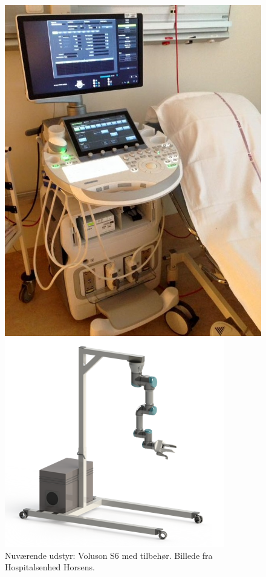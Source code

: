 \begin{figure}[H]
	\begin{minipage}{0.45\textwidth}
		\centering
		\includegraphics[width=\textwidth]{Figurer/udstyrHorsens.jpg}
		\caption{Nuværende udstyr: Voluson S6 med tilbehør. Billede fra Hospitalsenhed Horsens.}
		\label{udstyrHorsens}
	\end{minipage}
	\hspace{0.02\textwidth}
	\begin{minipage}{0.55\textwidth}
		\centering
		\includegraphics[width=\textwidth]{Figurer/StativMedUR3Render.png}

\end{minipage}
\end{figure}
